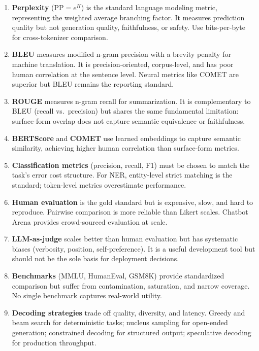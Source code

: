 \begin{enumerate}
    \item \textbf{Perplexity} ($\text{PP} = e^{H}$) is the standard language
          modeling metric, representing the weighted average branching factor.
          It measures prediction quality but not generation quality, faithfulness,
          or safety.  Use bits-per-byte for cross-tokenizer comparison.

    \item \textbf{BLEU} measures modified n-gram precision with a brevity penalty
          for machine translation.  It is precision-oriented, corpus-level, and
          has poor human correlation at the sentence level.  Neural metrics like
          COMET are superior but BLEU remains the reporting standard.

    \item \textbf{ROUGE} measures n-gram recall for summarization.  It is
          complementary to BLEU (recall vs.\ precision) but shares the same
          fundamental limitation: surface-form overlap does not capture semantic
          equivalence or faithfulness.

    \item \textbf{BERTScore} and \textbf{COMET} use learned embeddings to
          capture semantic similarity, achieving higher human correlation than
          surface-form metrics.

    \item \textbf{Classification metrics} (precision, recall, F1) must be
          chosen to match the task's error cost structure.  For NER, entity-level
          strict matching is the standard; token-level metrics overestimate
          performance.

    \item \textbf{Human evaluation} is the gold standard but is expensive, slow,
          and hard to reproduce.  Pairwise comparison is more reliable than
          Likert scales.  Chatbot Arena provides crowd-sourced evaluation at
          scale.

    \item \textbf{LLM-as-judge} scales better than human evaluation but has
          systematic biases (verbosity, position, self-preference).  It is
          a useful development tool but should not be the sole basis for
          deployment decisions.

    \item \textbf{Benchmarks} (MMLU, HumanEval, GSM8K) provide standardized
          comparison but suffer from contamination, saturation, and narrow
          coverage.  No single benchmark captures real-world utility.

    \item \textbf{Decoding strategies} trade off quality, diversity, and latency.
          Greedy and beam search for deterministic tasks; nucleus sampling for
          open-ended generation; constrained decoding for structured output;
          speculative decoding for production throughput.
\end{enumerate}

